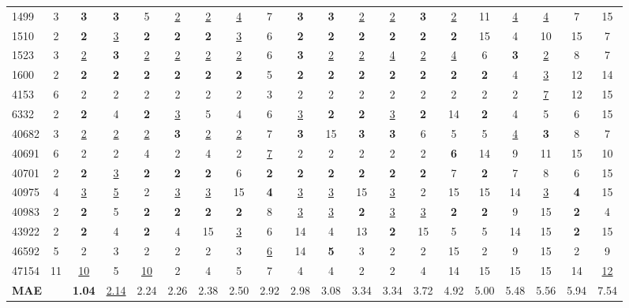 \begin{tabular}{l c c c c c c c c c c c c c c c c c c c }
1499 & 3 & \textbf{3} & \textbf{3} & 5 & \underline{2} & \underline{2} & \underline{4} & 7 & \textbf{3} & \textbf{3} & \underline{2} & \underline{2} & \textbf{3} & \underline{2} & 11 & \underline{4} & \underline{4} & 7 & 15 \\
1510 & 2 & \textbf{2} & \underline{3} & \textbf{2} & \textbf{2} & \textbf{2} & \underline{3} & 6 & \textbf{2} & \textbf{2} & \textbf{2} & \textbf{2} & \textbf{2} & \textbf{2} & 15 & 4 & 10 & 15 & 7 \\
1523 & 3 & \underline{2} & \textbf{3} & \underline{2} & \underline{2} & \underline{2} & \underline{2} & 6 & \textbf{3} & \underline{2} & \underline{2} & \underline{4} & \underline{2} & \underline{4} & 6 & \textbf{3} & \underline{2} & 8 & 7 \\
1600 & 2 & \textbf{2} & \textbf{2} & \textbf{2} & \textbf{2} & \textbf{2} & \textbf{2} & 5 & \textbf{2} & \textbf{2} & \textbf{2} & \textbf{2} & \textbf{2} & \textbf{2} & \textbf{2} & 4 & \underline{3} & 12 & 14 \\
4153 & 6 & 2 & 2 & 2 & 2 & 2 & 2 & 3 & 2 & 2 & 2 & 2 & 2 & 2 & 2 & 2 & \underline{7} & 12 & 15 \\
6332 & 2 & \textbf{2} & 4 & \textbf{2} & \underline{3} & 5 & 4 & 6 & \underline{3} & \textbf{2} & \textbf{2} & \underline{3} & \textbf{2} & 14 & \textbf{2} & 4 & 5 & 6 & 15 \\
40682 & 3 & \underline{2} & \underline{2} & \underline{2} & \textbf{3} & \underline{2} & \underline{2} & 7 & \textbf{3} & 15 & \textbf{3} & \textbf{3} & 6 & 5 & 5 & \underline{4} & \textbf{3} & 8 & 7 \\
40691 & 6 & 2 & 2 & 4 & 2 & 4 & 2 & \underline{7} & 2 & 2 & 2 & 2 & 2 & \textbf{6} & 14 & 9 & 11 & 15 & 10 \\
40701 & 2 & \textbf{2} & \underline{3} & \textbf{2} & \textbf{2} & \textbf{2} & 6 & \textbf{2} & \textbf{2} & \textbf{2} & \textbf{2} & \textbf{2} & \textbf{2} & 7 & \textbf{2} & 7 & 8 & 6 & 15 \\
40975 & 4 & \underline{3} & \underline{5} & 2 & \underline{3} & \underline{3} & 15 & \textbf{4} & \underline{3} & \underline{3} & 15 & \underline{3} & 2 & 15 & 15 & 14 & \underline{3} & \textbf{4} & 15 \\
40983 & 2 & \textbf{2} & 5 & \textbf{2} & \textbf{2} & \textbf{2} & \textbf{2} & 8 & \underline{3} & \underline{3} & \textbf{2} & \underline{3} & \underline{3} & \textbf{2} & \textbf{2} & 9 & 15 & \textbf{2} & 4 \\
43922 & 2 & \textbf{2} & 4 & \textbf{2} & 4 & 15 & \underline{3} & 6 & 14 & 4 & 13 & \textbf{2} & 15 & 5 & 5 & 14 & 15 & \textbf{2} & 15 \\
46592 & 5 & 2 & 3 & 2 & 2 & 2 & 3 & \underline{6} & 14 & \textbf{5} & 3 & 2 & 2 & 15 & 2 & 9 & 15 & 2 & 9 \\
47154 & 11 & \underline{10} & 5 & \underline{10} & 2 & 4 & 5 & 7 & 4 & 4 & 2 & 2 & 4 & 14 & 15 & 15 & 15 & 14 & \underline{12} \\
\midrule
\multicolumn{2}{l}{\textbf{MAE}} & \textbf{1.04} & \underline{2.14} & 2.24 & 2.26 & 2.38 & 2.50 & 2.92 & 2.98 & 3.08 & 3.34 & 3.34 & 3.72 & 4.92 & 5.00 & 5.48 & 5.56 & 5.94 & 7.54 \\
\bottomrule
\end{tabular}

